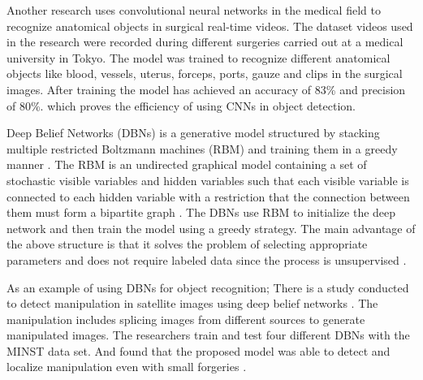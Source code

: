 \documentclass[12pt,twocolumn,a4paper]{article}
\begin{document}
    Another research \cite{Bamba2021-kd} uses convolutional neural networks in the medical field to recognize anatomical objects in surgical real-time videos. The dataset videos used in the research were recorded during different surgeries carried out at a medical university in Tokyo. The model was trained to recognize different anatomical objects like blood, vessels, uterus, forceps, ports, gauze and clips in the surgical images. After training the model has achieved an accuracy of 83\% and precision of 80\%. which proves the efficiency of using CNNs in object detection. 

    Deep Belief Networks (DBNs) is a generative model structured by stacking multiple restricted Boltzmann machines (RBM) and training them in a greedy manner \cite{Voulodimos2018-cu}. The RBM is an undirected graphical model containing a set of stochastic visible variables and hidden variables such that each visible variable is connected to each hidden variable with a restriction that the connection between them must form a bipartite graph \cite{Voulodimos2018-cu}. The DBNs use RBM to initialize the deep network and then train the model using a greedy strategy. The main advantage of the above structure is that it solves the problem of selecting appropriate parameters and does not require labeled data since the process is unsupervised \cite{Voulodimos2018-cu}.

    As an example of using DBNs for object recognition; There is a study conducted to detect manipulation in satellite images using deep belief networks \cite{Horvath2020-qh}. The manipulation includes splicing images from different sources to generate manipulated images. The researchers train and test four different DBNs with the MINST data set. And found that the proposed model was able to detect and localize manipulation even with small forgeries \cite{Horvath2020-qh}.
    
\end{document}
